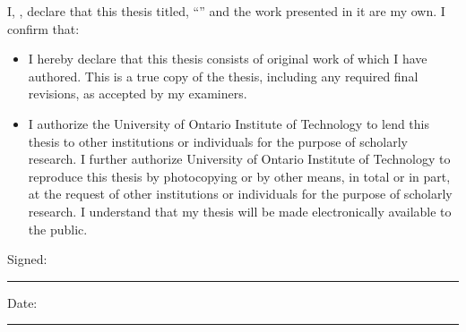 \begin{declaration}
\addchaptertocentry{\authorshipname} %
\noindent I, \authorname, declare that this thesis titled, \enquote{\ttitle} and the work presented in it are my own. I confirm that:

\begin{itemize} 
\item I hereby declare that this thesis consists of original work of which I have authored. This is a true copy of the thesis, including any required final revisions, as accepted by my examiners.
\item I authorize the University of Ontario Institute of Technology to lend this thesis to other institutions or individuals for the purpose of scholarly research. I further authorize University of Ontario Institute of Technology to reproduce this thesis by photocopying or by other means, in total or in part, at the request of other institutions or individuals for the purpose of scholarly research. I understand that my thesis will be made electronically available to the public.\\
\end{itemize}

 
\noindent Signed:\\
\rule[0.5em]{25em}{0.5pt} %
 
\noindent Date:\\
\rule[0.5em]{25em}{0.5pt} %
\end{declaration}




%


